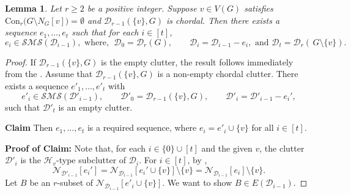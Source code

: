 \documentclass[12pt,reqno]{amsart}
\newtheorem{lemma}[proposition]{Lemma}
\theoremstyle{definition}
\newcommand{\Con}{{\mathrm{Con}}}
\def\N{\mathcal{N}}
\def\D{\mathcal{D}}
\def\SMS{\mathcal{SMS}}
\begin{document}
\begin{lemma}\label{chordal 3}
Let $r \ge 2$ be a positive integer. Suppose $v \in V(G)$ satisfies $\Con_r\bigl(G \setminus N_{G}[v]\bigr) = \emptyset$ and $\D_{r-1}(\{v\}, G)$ is chordal. Then there exists a sequence $e_1, \ldots, e_t$
such that for each $i\in[t]$,
\[e_i \in \SMS(\D_{i-1}), \text{~where,~} \; \D_0 = \D_r(G), \qquad\D_i = \D_{i-1} - e_i, \text{~and~}
\D_t = \D_r(\, G \setminus \{v\}).
\]
\end{lemma}
\begin{proof}

If $\D_{r-1}(\{v\}, G)$ is the empty clutter, the result follows immediately from the . Assume that $\D_{r-1}(\{v\}, G)$ is a non-empty chordal clutter. There exists a sequence $e'_1, \ldots, e'_t$
with 
\[e'_i \in \SMS(\D'_{i-1}), \qquad \D'_0 = \D_{r-1}(\{v\},G), \qquad \D'_i = \D'_{i-1} - e_i',\] such that $\D'_t$ is an empty clutter. 

\medskip
\noindent
\textbf{Claim}
Then $e_1 , \ldots, e_t $ is a required sequence, where $e_i = e'_i \cup \{v\}$ for all $i \in [t]$.  

\medskip
\noindent
\textbf{Proof of Claim:}
Note that, for each $i \in \{0\} \cup [t]$ and the given $v$, the clutter $\D'_i$ is the $\mathcal{H}_v$-type subclutter of $\mathcal{D}_i$. For $i\in[t]$, by , 
\begin{equation}\label{eq:4}
\N_{\D'_{i-1}}[e_i'] = \N_{\D_{i-1}}[e_i' \cup \{v\}] \setminus \{v\} = \N_{\D_{i-1}}[e_i] \setminus \{v\}.
\end{equation}
Let $B$ be an $r$-subset of $\N_{\D_{i-1}}[e'_i \cup \{v\}]$.  
We want to show $B \in E(\D_{i-1})$.


\end{proof}
\end{document}
